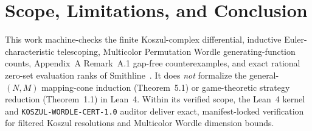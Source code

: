 \documentclass[11pt,twocolumn]{article}
\begin{document}
\section{Scope, Limitations, and Conclusion}\label{sec:conclusion}
This work machine-checks the finite Koszul-complex differential, inductive Euler-characteristic telescoping, Multicolor Permutation Wordle generating-function counts, Appendix~A Remark~A.1 gap-free counterexamples, and exact rational zero-set evaluation ranks of Smithline~\cite{smithline2026koszul}. It does \emph{not} formalize the general-$(N,M)$ mapping-cone induction (Theorem~5.1) or game-theoretic strategy reduction (Theorem~1.1) in Lean~4. Within its verified scope, the Lean~4 kernel and \texttt{KOSZUL-WORDLE-CERT-1.0} auditor deliver exact, manifest-locked verification for filtered Koszul resolutions and Multicolor Wordle dimension bounds.



\end{document}
